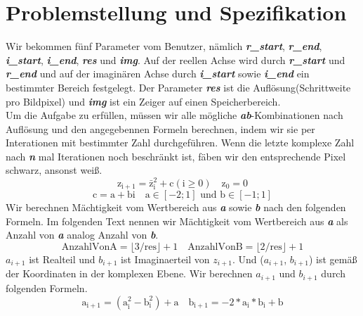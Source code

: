 \documentclass[course=erap]{aspdoc}
\begin{document}
\section{Problemstellung und Spezifikation}
Wir bekommen fünf Parameter vom Benutzer, nämlich \emph{\textbf{r\_start}}, \textbf{\emph{r\_end}}, \textbf{\emph{i\_start}}, \textbf{\emph{i\_end}}, \textbf{\emph{res}} und \textbf{\emph{img}}. Auf der reellen Achse wird durch \emph{\textbf{r\_start}} und \emph{\textbf{r\_end}} und auf der imaginären Achse durch \textbf{\emph{i\_start}} sowie\textbf{\emph{ i\_end}} ein bestimmter Bereich festgelegt. Der Parameter \emph{\textbf{res}} ist die Auflösung(Schrittweite pro Bildpixel) und \textbf{\emph{img}} ist ein Zeiger auf einen Speicherbereich.
\\Um die Aufgabe zu erfüllen, müssen wir alle mögliche \textbf{\emph{ab}}-Kombinationen nach Auflösung und den angegebennen Formeln berechnen, indem wir sie per Interationen mit bestimmter Zahl durchgeführen. Wenn die letzte komplexe Zahl nach \textbf{\emph{n}} mal Iterationen noch beschränkt ist, fäben wir den entsprechende Pixel schwarz, ansonst weiß.
 \begin{equation}
\mathrm{z_{i+1}}=\mathrm{\bar{z}_{i}^{2}}+\mathrm{c}(\mathrm{i} \geq 0) \quad \mathrm{z_{0}}=0
\end{equation}
\begin{equation}\mathrm{c}=\mathrm{a}+\mathrm{bi} \quad \mathrm{a} \in[-2 ; 1] \text { und } \mathrm{b} \in[-1 ; 1]\end{equation}
 Wir berechnen Mächtigkeit vom Wertbereich aus \textbf{\emph{a}} sowie \textbf{\emph{b}} nach den folgenden Formeln. Im folgenden Text nennen wir Mächtigkeit vom Wertbereich aus \textbf{\emph{a}} als Anzahl von \textbf{\emph{a}} analog Anzahl von \textbf{\emph{b}}.
 \begin{equation}
\mathrm{AnzahlVonA}  =\lfloor 3 /\mathrm{res}\rfloor+1   \quad  \mathrm{AnzahlVonB}  =\lfloor 2 / \mathrm{res}\rfloor+ 1
\end{equation}
\textbf{\emph{$a_{i+1}$}} ist Realteil und \textbf{\emph{$b_{i+1}$}} ist Imaginaerteil von \emph{\textbf{$z_{i+1}$}}. Und (\textbf{\emph{$a_{i+1}$}}, \textbf{\emph{$b_{i+1}$}}) ist gemäß der Koordinaten in der komplexen Ebene. Wir berechnen \textbf{\emph{$a_{i+1}$}} und \textbf{\emph{$b_{i+1}$}} durch folgenden Formeln.
\begin{equation}
\label{eq4}
\mathrm{a_{i+1}}= (\mathrm{a_{i}^2}-\mathrm{b_{i}^2})+\mathrm{a}\quad \mathrm{b_{i+1}} = -2*\mathrm{a_{i}}*\mathrm{b_{i}}+\mathrm{b}
\end{equation}
\end{document}
